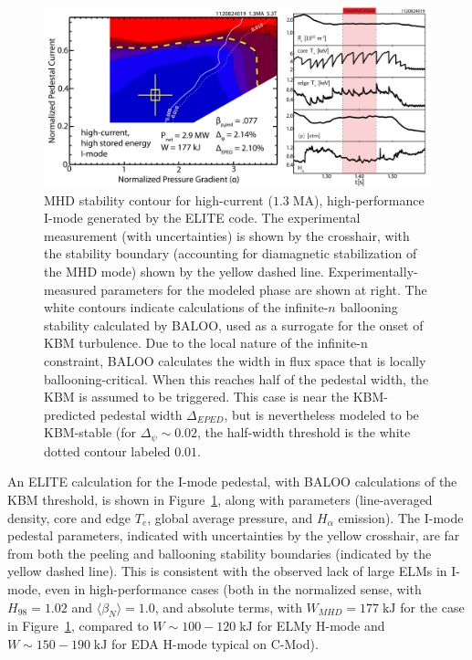 \documentclass[12pt,floatfix,showpacs]{revtex4-1}
\begin{document}
\begin{figure}[ht]
 \includegraphics[width=\textwidth]{pdfgraphics/1120824019_ELITE_stitch_v2.pdf}
 \caption{MHD stability contour for high-current ($1.3 \;\mbox{MA}$), high-performance I-mode generated by the ELITE code.  The experimental measurement (with uncertainties) is shown by the crosshair, with the stability boundary (accounting for diamagnetic stabilization of the MHD mode) shown by the yellow dashed line.  Experimentally-measured parameters for the modeled phase are shown at right.  The white contours indicate calculations of the infinite-$n$ ballooning stability calculated by BALOO, used as a surrogate for the onset of KBM turbulence.  Due to the local nature of the infinite-n constraint, BALOO calculates the width in flux space that is locally ballooning-critical.  When this reaches half of the pedestal width, the KBM is assumed to be triggered. This case is near the KBM-predicted pedestal width $\Delta_{EPED}$, but is nevertheless modeled to be KBM-stable (for $\Delta_\psi \sim 0.02$, the half-width threshold is the white dotted contour labeled $0.01$.}
 \label{fig:elite_1120824019}
\end{figure}

An ELITE calculation for the I-mode pedestal, with BALOO calculations of the KBM threshold, is shown in Figure~\ref{fig:elite_1120824019}, along with parameters (line-averaged density, core and edge $T_e$, global average pressure, and $H_\alpha$ emission).  
The I-mode pedestal parameters, indicated with uncertainties by the yellow crosshair, are far from both the peeling and ballooning stability boundaries (indicated by the yellow dashed line).  
This is consistent with the observed lack of large ELMs in I-mode, even in high-performance cases (both in the normalized sense, with $H_{98} = 1.02$ and $\langle \beta_N \rangle = 1.0$, and absolute terms, with $W_{MHD} = 177 \;\mbox{kJ}$ for the case in Figure~\ref{fig:elite_1120824019}, compared to $W \sim 100-120\;\mbox{kJ}$ for ELMy H-mode and $W \sim 150-190\;\mbox{kJ}$ for EDA H-mode typical on C-Mod).
\end{document}
